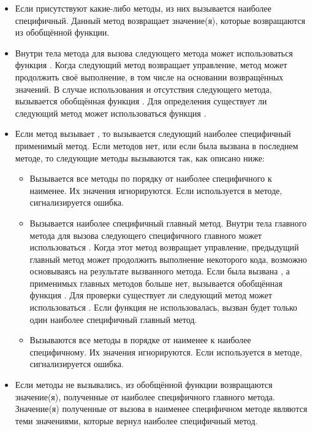 \begin{itemize}

\item Если присутствуют какие-либо  методы, из них вызывается
  наиболее специфичный. Данный метод возвращает значение(я), которые
  возвращаются из обобщённой функции.

\item Внутри тела  метода для вызова следующего метода может
  использоваться функция . Когда следующий метод
  возвращает управление,  метод может продолжить своё выполнение, в
  том числе на основании возвращённых значений. В случае использования
   и отсутствия следующего метода, вызывается обобщённая
  функция . Для определения существует ли следующий метод
  может использоваться функция .

\item
Если  метод вызывает , то вызывается следующий
наиболее специфичный  применимый метод. Если  методов
нет, или если  была вызвана в последнем 
методе, то следующие методы вызываются так, как описано ниже:

\begin{itemize}

\item Вызывается все  методы по порядку от наиболее специфичного к
  наименее. Их значения игнорируются. Если  используется в
   методе, сигнализируется ошибка.

\item Вызывается наиболее специфичный главный метод. Внутри тела главного метода
  для вызова следующего специфичного главного может использоваться
  . Когда этот метод возвращает управление, предыдущий
  главный метод может продолжить выполнение некоторого кода, возможно
  основываясь на результате вызванного метода. Если была вызвана
  , а применимых главных методов больше нет, вызывается
  обобщённая функция . Для проверки существует ли следующий
  метод может использоваться . Если функция
   не использовалась, вызван будет только один наиболее
  специфичный главный метод.

\item Вызываются все  методы в порядке от наименее к
  наиболее специфичному. Их значения игнорируются. Если 
  используется в  методе, сигнализируется ошибка.
\end{itemize}

\item Если  методы не вызывались, из обобщённой функции возвращаются
  значение(я), полученные от наиболее специфичного главного метода. Значение(я)
  полученные от вызова  в наименее специфичном 
  методе являются теми значениями, которые вернул наиболее специфичный метод.
\end{itemize}


